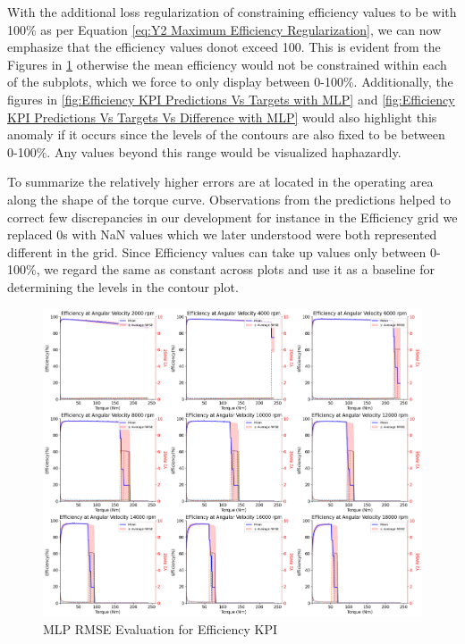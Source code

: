 \documentclass{report} %
\begin{document}
With the additional loss regularization of constraining efficiency values to be with 100\% as per Equation \ref{eq:Y2 Maximum Efficiency Regularization}, we can now emphasize 
that the efficiency values donot exceed 100. This is evident from the Figures in \ref{fig:MLP RMSE Evaluation for Efficiency KPI} otherwise the mean efficiency would not be constrained 
within each of the subplots, which we force to only display between 0-100\%. Additionally, the figures in \ref{fig:Efficiency KPI Predictions Vs Targets with MLP} and 
\ref{fig:Efficiency KPI Predictions Vs Targets Vs Difference with MLP} would also highlight this anomaly if it occurs since the levels of the contours are also fixed to 
be between 0-100\%. Any values beyond this range would be visualized haphazardly.

To summarize the relatively higher errors are at located in the operating area along the shape of the torque curve.
Observations from the predictions helped to correct few discrepancies in our development for instance in the Efficiency grid we replaced 0s with \ac{NaN} values which 
we later understood were both represented different in the grid. Since Efficiency values can take up values only between 0-100\%, we regard the same as constant 
across plots and use it as a baseline for determining the levels in the contour plot.

\begin{figure}[H]
    \centering
    \includegraphics[width=1\textwidth]{./ReportImages/rmse_eta_MLP.png} 
    \caption{\ac{MLP} \ac{RMSE} Evaluation for Efficiency \ac{KPI}} 
    \label{fig:MLP RMSE Evaluation for Efficiency KPI}
\end{figure}
\end{document}
